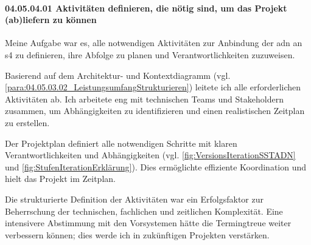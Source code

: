\paragraph*{04.05.04.01 Aktivitäten definieren, die nötig sind, um das Projekt (ab)liefern zu können}
\label{para:04.05.04.01_AktivitätenDefinieren}

\par Meine Aufgabe war es, alle notwendigen Aktivitäten zur Anbindung der \gls{adn} an \gls{s4} zu definieren, ihre Abfolge zu planen und Verantwortlichkeiten zuzuweisen.

\par Basierend auf dem Architektur- und Kontextdiagramm (vgl. \ref{para:04.05.03.02_LeistungsumfangStrukturieren}) leitete ich alle erforderlichen Aktivitäten ab. Ich arbeitete eng mit technischen Teams und Stakeholdern zusammen, um Abhängigkeiten zu identifizieren und einen realistischen Zeitplan zu erstellen.

\par Der Projektplan definiert alle notwendigen Schritte mit klaren Verantwortlichkeiten und Abhängigkeiten (vgl. \autoref{fig:VersionsIterationSSTADN} und \autoref{fig:StufenIterationErklärung}). Dies ermöglichte effiziente Koordination und hielt das Projekt im Zeitplan.

\par Die strukturierte Definition der Aktivitäten war ein Erfolgsfaktor zur Beherrschung der technischen, fachlichen und zeitlichen Komplexität. Eine intensivere Abstimmung mit den Vorsystemen hätte die Termingtreue weiter verbessern können; dies werde ich in zukünftigen Projekten verstärken.